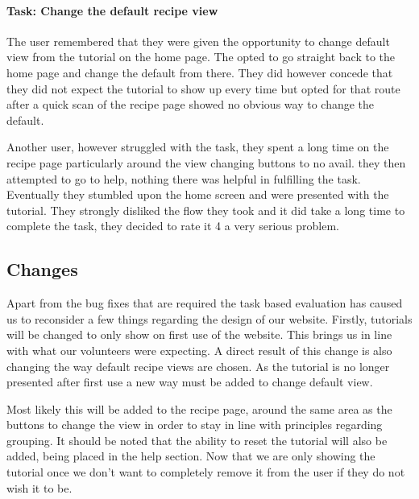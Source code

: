 \paragraph{Task: Change the default recipe view}

The user remembered that they were given the opportunity to change
default view from the tutorial on the home page. The opted to go
straight back to the home page and change the default from there. They
did however concede that they did not expect the tutorial to show up
every time but opted for that route after a quick scan of the recipe
page showed no obvious way to change the default.

Another user, however struggled with the task, they spent a long time
on the recipe page particularly around the view changing buttons to no
avail. they then attempted to go to help, nothing there was helpful in
fulfilling the task. Eventually they stumbled upon the home screen and
were presented with the tutorial. They strongly disliked the flow they
took and it did take a long time to complete the task, they decided to
rate it 4 a very serious problem.

\subsection{Changes}


Apart from the bug fixes that are required the task based evaluation
has caused us to reconsider a few things regarding the design of our
website. Firstly, tutorials will be changed to only show on first use
of the website. This brings us in line with what our volunteers were
expecting. A direct result of this change is also changing the way
default recipe views are chosen. As the tutorial is no longer
presented after first use a new way must be added to change default
view.

Most likely this will be added to the recipe page, around the same
area as the buttons to change the view in order to stay in line with
principles regarding grouping. It should be noted that the ability to
reset the tutorial will also be added, being placed in the help
section. Now that we are only showing the tutorial once we don’t want
to completely remove it from the user if they do not wish it to be.
